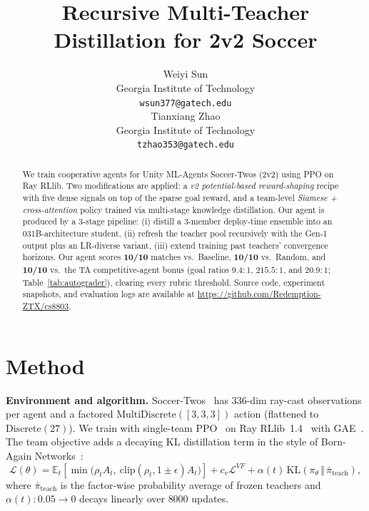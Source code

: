 \documentclass{article}
\title{Recursive Multi-Teacher Distillation for 2v2 Soccer}
\author{
  Weiyi Sun \\
  Georgia Institute of Technology \\
  \texttt{wsun377@gatech.edu} \\
  \And
  Tianxiang Zhao \\
  Georgia Institute of Technology \\
  \texttt{tzhao353@gatech.edu} \\
}
\begin{document}
\maketitle

\vspace{-6pt}
\begin{abstract}
We train cooperative agents for Unity ML-Agents Soccer-Twos (2v2) using PPO on Ray RLlib.  Two modifications are applied: a \emph{v2 potential-based reward-shaping} recipe with five dense signals on top of the sparse goal reward, and a team-level \emph{Siamese + cross-attention} policy trained via multi-stage knowledge distillation.  Our agent is produced by a 3-stage pipeline: (i) distill a 3-member deploy-time ensemble into an 031B-architecture student, (ii) refresh the teacher pool recursively with the Gen-1 output plus an LR-diverse variant, (iii) extend training past teachers' convergence horizons.  Our agent scores \textbf{10/10} matches vs.\ Baseline, \textbf{10/10} vs.\ Random, and \textbf{10/10} vs.\ the TA competitive-agent bonus (goal ratios $9.4\!:\!1$, $215.5\!:\!1$, and $20.9\!:\!1$; Table~\ref{tab:autograder}), clearing every rubric threshold.  Source code, experiment snapshots, and evaluation logs are available at \url{https://github.com/Redemption-ZTX/cs8803}.
\end{abstract}

\vspace{-6pt}

\vspace{-6pt}
\section{Method}
\label{sec:method}

\textbf{Environment and algorithm.}  Soccer-Twos~\citep{cotta2021soccer} has $336$-dim ray-cast observations per agent and a factored $\text{MultiDiscrete}([3,3,3])$ action (flattened to $\mathrm{Discrete}(27)$).  We train with single-team PPO~\citep{schulman2017ppo} on Ray RLlib~1.4~\citep{liang2018rllib} with GAE~\citep{schulman2016gae}.  The team objective adds a decaying KL distillation term in the style of Born-Again Networks~\citep{furlanello2018born}:
\begin{equation}
\mathcal{L}(\theta) = \mathbb{E}_t\!\left[\min\!\big(\rho_t A_t,\ \mathrm{clip}(\rho_t, 1{\pm}\epsilon)A_t\big)\right] + c_v \mathcal{L}^{VF} + \alpha(t)\, \mathrm{KL}\!\left(\pi_\theta \,\Vert\, \bar\pi_{\text{teach}}\right),
\label{eq:loss}
\end{equation}
where $\bar\pi_{\text{teach}}$ is the factor-wise probability average of frozen teachers and $\alpha(t):0.05\!\to\!0$ decays linearly over $8000$ updates.
\end{document}
